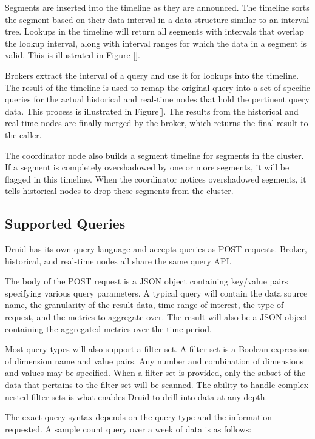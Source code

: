 \documentclass{vldb}
\begin{document}
Segments are inserted into the timeline as they are announced. The timeline
sorts the segment based on their data interval in a data structure similar to
an interval tree. Lookups in the timeline will return all segments with
intervals that overlap the lookup interval, along with interval ranges for
which the data in a segment is valid. This is illustrated in Figure [].

Brokers extract the interval of a query and use it for lookups into the
timeline. The result of the timeline is used to remap the original query into a
set of specific queries for the actual historical and real-time nodes that hold
the pertinent query data. This process is illustrated in Figure[]. The results
from the historical and real-time nodes are finally merged by the broker, which
returns the final result to the caller.

The coordinator node also builds a segment timeline for segments in the
cluster. If a segment is completely overshadowed by one or more segments, it
will be flagged in this timeline. When the coordinator notices overshadowed
segments, it tells historical nodes to drop these segments from the cluster.

\subsection{Supported Queries}
Druid has its own query language and accepts queries as POST requests. Broker,
historical, and real-time nodes all share the same query API. 

The body of the POST request is a JSON object containing key/value pairs
specifying various query parameters. A typical query will contain the data
source name, the granularity of the result data, time range of interest, the
type of request, and the metrics to aggregate over. The result will also be a
JSON object containing the aggregated metrics over the time period. 

Most query types will also support a filter set. A filter set is a Boolean
expression of dimension name and value pairs. Any number and combination of
dimensions and values may be specified. When a filter set is provided, only the
subset of the data that pertains to the filter set will be scanned. The ability
to handle complex nested filter sets is what enables Druid to drill into data
at any depth. 

The exact query syntax depends on the query type and the information requested.
A sample count query over a week of data is as follows: 
\end{document}
